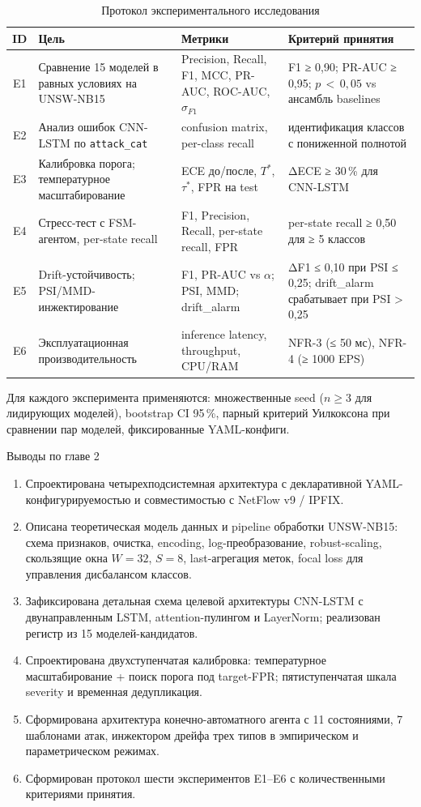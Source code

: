 \begin{table}[H]
\caption{Протокол экспериментального исследования}
\label{tab:experiments}
\centering
\small
\setlength{\tabcolsep}{4pt}
\begin{tabularx}{\linewidth}{|c|Z|Z|Z|}
\hline
ID & Цель & Метрики & Критерий принятия \\
\hline
E1 &
Сравнение 15 моделей в равных условиях на UNSW-NB15 &
Precision, Recall, F1, MCC, PR-AUC, ROC-AUC, $\sigma_{F1}$ &
F1 ≥ 0,90; PR-AUC ≥ 0,95; ${p}\,{<}\,0{,}05$ vs ансамбль baselines \\
\hline
E2 &
Анализ ошибок CNN-LSTM по \texttt{attack\_cat} &
confusion matrix, per-class recall &
идентификация классов с пониженной полнотой \\
\hline
E3 &
Калибровка порога; температурное масштабирование &
ECE до/после, $T^*$, $\tau^*$, FPR на test &
ΔECE ≥ 30\,\% для CNN-LSTM \\
\hline
E4 &
Стресс-тест с FSM-агентом, per-state recall &
F1, Precision, Recall, per-state recall, FPR &
per-state recall ≥ 0{,}50 для ≥ 5 классов \\
\hline
E5 &
Drift-устойчивость; PSI/MMD-инжектирование &
F1, PR-AUC vs $\alpha$; PSI, MMD; drift\_alarm &
ΔF1 ≤ 0,10 при PSI ≤ 0,25; drift\_alarm срабатывает при PSI > 0,25 \\
\hline
E6 &
Эксплуатационная производительность &
inference latency, throughput, CPU/RAM &
NFR-3 (≤ 50 мс), NFR-4 (≥ 1000 EPS) \\
\hline
\end{tabularx}
\end{table}

Для каждого эксперимента применяются: множественные seed
(\(n \geq 3\) для лидирующих моделей), bootstrap CI 95\,\%, парный
критерий Уилкоксона при сравнении пар моделей, фиксированные
YAML-конфиги.

\noindent Выводы по главе 2

\begin{enumerate}
    \item Спроектирована четырехподсистемная архитектура с
    декларативной YAML-конфигурируемостью и совместимостью с
    NetFlow v9 / IPFIX.
    \item Описана теоретическая модель данных и pipeline обработки
    UNSW-NB15: схема признаков, очистка, encoding, log-преобразование,
    robust-scaling, скользящие окна $W=32$, $S=8$, last-агрегация
    меток, focal loss для управления дисбалансом классов.
    \item Зафиксирована детальная схема целевой архитектуры
    CNN-LSTM с двунаправленным LSTM, attention-пулингом и
    LayerNorm; реализован регистр из 15 моделей-кандидатов.
    \item Спроектирована двухступенчатая калибровка: температурное
    масштабирование + поиск порога под target-FPR; пятиступенчатая
    шкала severity и временная дедупликация.
    \item Сформирована архитектура конечно-автоматного агента с
    11 состояниями, 7 шаблонами атак, инжектором дрейфа трех типов
    в эмпирическом и параметрическом режимах.
    \item Сформирован протокол шести экспериментов E1--E6 с
    количественными критериями принятия.
\end{enumerate}
